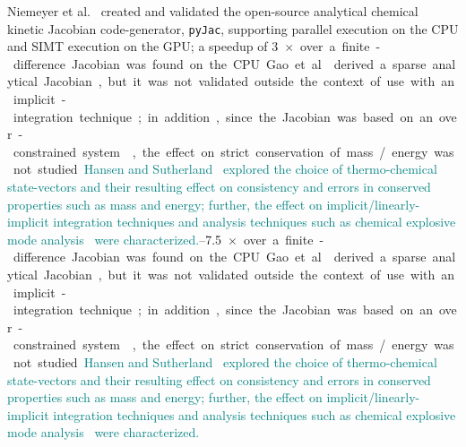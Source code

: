 \documentclass[12pt,number,sort&compress,preprint]{elsarticle}
\newcommand{\add}[1]{{\sloppy\textcolor{teal}{#1}}}  %
\begin{document}
Niemeyer et al.~\cite{Niemeyer:2016aa} created and validated the open-source analytical chemical kinetic Jacobian code-generator, \texttt{pyJac}, supporting parallel execution on the CPU and SIMT execution on the GPU; a speedup of \SIrange{3}{7.5}{$\times$} over a finite-difference Jacobian was found on the CPU.
Gao et al.~\cite{GAO2015287} derived a sparse analytical Jacobian, but it was not validated outside the context of use with an implicit-integration technique; in addition, since the Jacobian was based on an over-constrained system~\cite{HANSEN2018257}, the effect on strict conservation of mass\slash energy was not studied.
\add{Hansen and Sutherland~\cite{HANSEN2018257} explored the choice of thermo-chemical state-vectors and their resulting effect on consistency and errors in conserved properties such as mass and energy; further, the effect on implicit\slash linearly-implicit integration techniques and analysis techniques such as chemical explosive mode analysis~\cite{lu_yoo_chen_law_2010} were characterized.}
\end{document}
